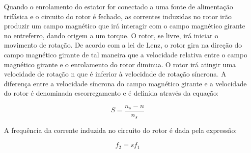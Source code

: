 Quando o enrolamento do estator for conectado a uma fonte de alimentação trifásica e o circuito do rotor é fechado, as correntes induzidas no rotor irão produzir um campo magnético que irá interagir com o campo magnético girante no entreferro, dando origem a um torque. O rotor, se livre, irá iniciar o movimento de rotação. De acordo com a lei de Lenz, o rotor gira na direção do campo magnético girante de tal maneira que a velocidade relativa entre o campo magnético girante e o enrolamento do rotor diminua. O rotor irá atingir uma velocidade de rotação n que é inferior à velocidade de rotação síncrona. A diferença entre a velocidade síncrona do campo magnético girante e a velocidade do rotor é denominada escorregamento e é definida através da equação:

$$S = \frac{n_s - n}{n_s}$$

A frequência da corrente induzida no circuito do rotor é dada pela expressão:

$$f_2 = s  f_1$$

